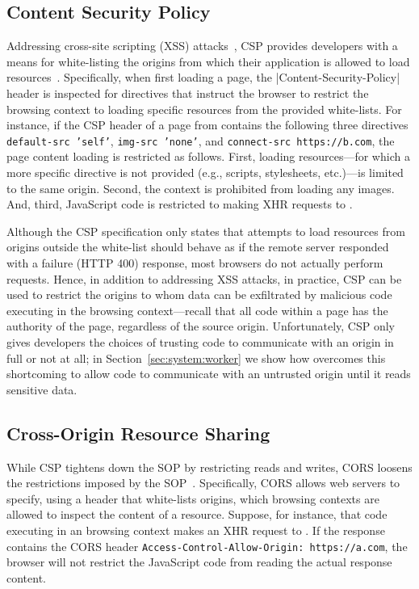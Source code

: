 \subsection{Content Security Policy} 
\label{sec:background:csp}

Addressing cross-site scripting (XSS) attacks~\cite{kerschbaum2007simple}, CSP
provides developers with a means for white-listing the origins from which their
application is allowed to load resources~\cite{csp}.
%
Specifically, when first loading a page, the
\js|Content-Security-Policy| header is inspected for directives that
instruct the browser to restrict the browsing context to loading
specific resources from the provided white-lists.
%
For instance, if the CSP header of a page from  contains
the following three directives
%
\texttt{default-src 'self'}, \texttt{img-src 'none'}, and
\texttt{connect-src https://b.com},
%
the page content loading is restricted as follows.
%
First, loading resources---for which a more specific directive is not
provided (e.g., scripts, stylesheets, etc.)---is limited to the same
origin.
%
Second, the context is prohibited from loading any images.
%
And, third, JavaScript code is restricted to making XHR requests to
.

Although the CSP specification only states that attempts to load
resources from origins outside the white-list should behave as if the
remote server responded with a failure (HTTP 400) response, most
browsers do not actually perform requests.
%
Hence, in addition to addressing XSS attacks, in practice, CSP can
be used to restrict the origins to whom data can be exfiltrated by
malicious code executing in the browsing context---recall that all code
within a page has the authority of the page, regardless of the source
origin.
%
Unfortunately, CSP only gives developers the choices of trusting code
to communicate with an origin in full or not at all;
%
in Section~\ref{sec:system:worker} we show how \sys{} overcomes this
shortcoming to allow code to communicate with an untrusted origin
until it reads sensitive data.


\subsection{Cross-Origin Resource Sharing} 
\label{sec:background:cors}

While CSP tightens down the SOP by restricting reads and writes, CORS
loosens the restrictions imposed by the SOP~\cite{rfc6454, VanKesteren2012,
googlehandbook}.
%
Specifically, CORS allows web servers to specify, using a header that
white-lists origins, which browsing contexts are allowed to inspect
the content of a resource.
%
Suppose, for instance, that code executing in an  browsing
context makes an XHR request to .
%
If the response contains the CORS header
\texttt{Access-Control-Allow-Origin: https://a.com}, the browser will
not restrict the JavaScript code from reading the actual response
content.

